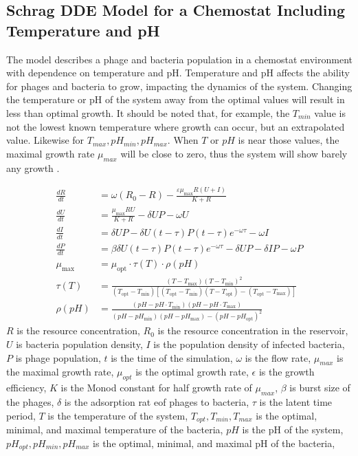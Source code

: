 \subsection{Schrag DDE Model for a Chemostat Including Temperature and pH}
\label{sec:lit:schrag}
The \citet{bekeModellingInteractionBacteriophages2016, schragHostParasiteCoexistenceRole1996} model describes a phage and bacteria population in a chemostat environment with dependence on temperature and pH. 
Temperature and pH affects the ability for phages and bacteria to grow, impacting the dynamics of the system. 
Changing the temperature or pH of the system away from the optimal values will result in less than optimal growth.
It should be noted that, for example, the $T_{min}$ value is not the lowest known temperature where growth can occur, but an extrapolated value. 
Likewise for $T_{max}, pH_{min}, pH_{max}$. 
When $T$ or $pH$ is near those values, the maximal growth rate $\mu_{max}$ will be close to zero, thus the system will show barely any growth \cite{bekeModellingInteractionBacteriophages2016}. 

\begin{align}
    \frac{dR}{dt} &= \omega (R_0 - R) - \frac{\varepsilon \mu_{\text{max}} R(U + I)}{K + R} \\
    \frac{dU}{dt} &= \frac{\mu_{\text{max}} RU}{K + R} - \delta UP - \omega U \\
    \frac{dI}{dt} &= \delta UP - \delta U(t - \tau) P(t - \tau) e^{-\omega \tau} - \omega I \\
    \frac{dP}{dt} &= \beta \delta U(t - \tau) P(t - \tau) e^{-\omega \tau} - \delta UP - \delta IP - \omega P\\
    \mu_{\text{max}} &= \mu_{\text{opt}} \cdot \tau(T) \cdot \rho(pH) \\
    \tau(T) &= \frac{(T - T_{\text{max}})(T - T_{\text{min}})^2}{(T_{\text{opt}} - T_{\text{min}})\left[(T_{\text{opt}} - T_{\text{min}})(T - T_{\text{opt}}) - (T_{\text{opt}} - T_{\text{max}})\right]} \\
    \rho(pH) &= \frac{(pH - pH\cdot T_{\text{min}})(pH - pH\cdot T_{\text{max}})}{(pH - pH_{\text{min}})(pH - pH_{\text{max}}) - (pH - pH_{\text{opt}})^2}
\end{align}
$R$ is the resource concentration, $R_0$ is the resource concentration in the reservoir, $U$ is bacteria population density, $I$ is the population density of infected bacteria, $P$ is phage population, $t$ is the time of the simulation, $\omega$ is the flow rate, $\mu_{max}$ is the maximal growth rate, $\mu_{opt}$ is the optimal growth rate, $\epsilon$ is the growth efficiency, $K$ is the Monod constant for half growth rate of $\mu_{max}$, $\beta$ is burst size of the phages, $\delta$ is the adsorption rat eof phages to bacteria, $\tau$ is the latent time period, $T$ is the temperature of the system, $T_{opt}, T_{min}, T_{max}$ is the optimal, minimal, and maximal temperature of the bacteria, $pH$ is the pH of the system, $pH_{opt}, pH_{min}, pH_{max}$ is the optimal, minimal, and maximal pH of the bacteria, 

